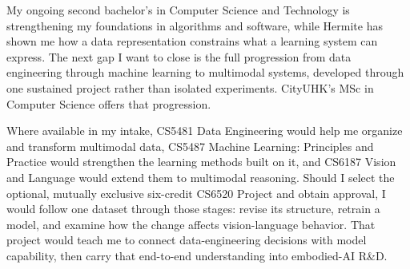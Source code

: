 My ongoing second bachelor's in Computer Science and Technology is strengthening my foundations in algorithms and software, while Hermite has shown me how a data representation constrains what a learning system can express. The next gap I want to close is the full progression from data engineering through machine learning to multimodal systems, developed through one sustained project rather than isolated experiments. CityUHK's MSc in Computer Science offers that progression.

Where available in my intake, CS5481 Data Engineering would help me organize and transform multimodal data, CS5487 Machine Learning: Principles and Practice would strengthen the learning methods built on it, and CS6187 Vision and Language would extend them to multimodal reasoning. Should I select the optional, mutually exclusive six-credit CS6520 Project and obtain approval, I would follow one dataset through those stages: revise its structure, retrain a model, and examine how the change affects vision-language behavior. That project would teach me to connect data-engineering decisions with model capability, then carry that end-to-end understanding into embodied-AI R\&D.
